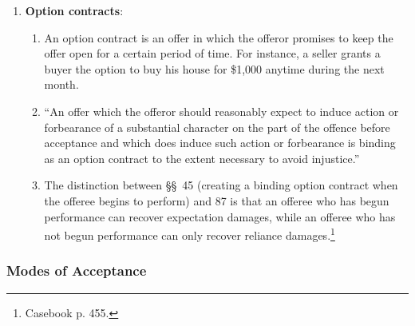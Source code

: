 \begin{enumerate}
\begin{enumerate}
\begin{enumerate}
\begin{enumerate}
                bids are in and then undercutting them, avoiding the cost of 
                estimating his own bid.
            \end{enumerate}
            \item Most courts have followed \emph{Drennan}, but at least one 
            has deviated.\footnote{Casebook p. 453.}
            \item \S\ 90 reliance damages may not be available when the 
            general contractor engages in these kinds of unethical practices.  
            \emph{Preload Technology, Inc. v. A.B. \& J. Construction Co., 
            Inc.}
        \end{enumerate}
        \item \textbf{Option contracts}:
        \begin{enumerate}
            \item An option contract is an offer in which the offeror promises 
            to keep the offer open for a certain period of time. For instance, 
            a seller grants a buyer the option to buy his house for \$1,000 
            anytime during the next month.
            \item ``An offer which the offeror should reasonably expect to 
            induce action or forbearance of a substantial character on the 
            part of the offence before acceptance and which does induce such 
            action or forbearance is binding as an option contract to the 
            extent necessary to avoid injustice.''
            \item The distinction between \S\S\ 45 (creating a binding option 
            contract when the offeree begins to perform) and 87 is that an 
            offeree who has begun performance can recover expectation damages, 
            while an offeree who has not begun performance can only recover 
            reliance damages.\footnote{Casebook p. 455.}
        \end{enumerate}
    \end{enumerate}
\end{enumerate}

\subsubsection{Modes of Acceptance}

